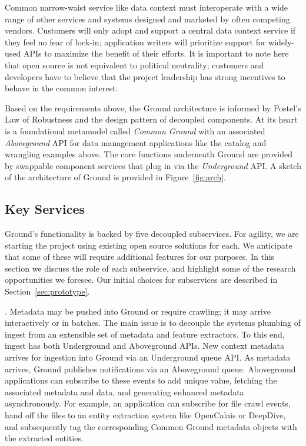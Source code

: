 \documentclass{sig-alternate}
\begin{document}
Common narrow-waist service like data context must interoperate with a wide range of other services and systems designed and marketed by often competing vendors.
Customers will only adopt and support a central data context service if they feel no fear of lock-in; application writers will prioritize support for widely-used APIs to maximize the benefit of their efforts. 
It is important to note here that open source is not equivalent to political neutrality; customers and developers have to believe that the project leadership has strong incentives to behave in the common interest. 

\vspace{1em}
Based on the requirements above, the Ground architecture is informed by Postel's Law of Robustness and the design pattern of decoupled components. 
At its heart is a foundational metamodel called \emph{Common Ground} with an associated \emph{Aboveground} API for data management applications like the catalog and wrangling examples above. 
The core functions underneath Ground are provided by swappable component services that plug in via the \emph{Underground} API. 
A sketch of the architecture of Ground is provided in Figure~\ref{fig:arch}.


\subsection{Key Services}
Ground's functionality is backed by five decoupled subservices.  For agility, we are starting the project using existing open source solutions for each.  We anticipate that some of these will require additional features for our purposes. In this section we discuss the role of each subservice, and highlight some of the research opportunities we foresee.  Our initial choices for subservices are described in Section~\ref{sec:prototype}.

.  Metadata may be pushed into Ground or require crawling; it may arrive interactively or in batches. 
The main issue is to decouple the systems plumbing of ingest from an extensible set of metadata and feature extractors.
To this end, ingest has both Underground and Aboveground APIs.
New context metadata arrives for ingestion into Ground via an Underground queue API. 
As metadata arrives, Ground publishes notifications via an Aboveground queue. Aboveground applications can subscribe to these events to add unique value, fetching the associated metadata and data, and generating enhanced metadata asynchronously. 
For example, an application can subscribe for file crawl events, hand off the files to an entity extraction system like OpenCalais or DeepDive, and subsequently tag the corresponding Common Ground metadata objects with  the extracted entities.
\end{document}

